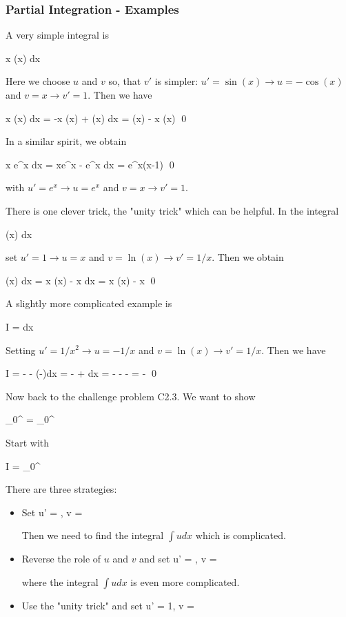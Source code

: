 \subsubsection{Partial Integration - Examples}

A very simple integral is

\bee
\int x \sin(x) dx
\eee

Here we choose $u$ and $v$ so, that $v'$ is simpler: $u'=\sin(x) \rightarrow u = -\cos(x)$ and $v=x \rightarrow v'=1$. Then we have

\bee
\int x \sin(x) dx = -x \cos(x) + \int \cos(x) dx = \sin(x) - x \cos(x) \qed
\eee

In a similar spirit, we obtain

\bee
\int x e^x dx = xe^x - \int e^x dx = e^x(x-1) \qed
\eee

with $u'=e^x \rightarrow u=e^x$ and $v=x \rightarrow v'=1$.

There is one clever trick, the "unity trick" which can be helpful. In the integral

\bee
\int \ln(x) dx
\eee

set $u'=1 \rightarrow u = x$ and $v = \ln(x) \rightarrow v' = 1/x$. Then we obtain

\bee
\int \ln(x) dx = x \ln(x) - \int x  dx = x \ln(x) - x \qed
\eee

A slightly more complicated example is

\bee
I = \int {}dx
\eee

Setting $u'=1/x^2 \rightarrow u=-1/x$ and $v=\ln(x) \rightarrow v'=1/x$. Then we have

\bee
I = - - \int \left(-\right)dx = - + \int {}dx = - - - = - \qed
\eee

Now back to the challenge problem C2.3. We want to show

\bee
\int_0^\infty {} = \int_0^\infty {}
\eee

Start with

\bee
I = \int_0^\infty {}
\eee

There are three strategies:

\begin{itemize}
	\item Set
	\bee
	u' = , v = 
	\eee
	
	Then we need to find the integral $\int udx$ which is complicated. 
	
	\item Reverse the role of $u$ and $v$ and set 
	\bee
	u' = , v = 
	\eee
	
	where the integral $\int u dx$ is even more complicated.
	
	\item Use the "unity trick" and set
	\bee
	u' = 1, v = 
	\eee
\end{itemize}

